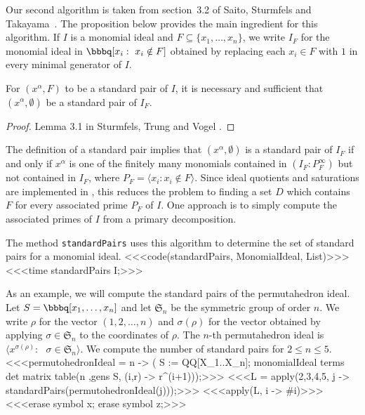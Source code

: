 Our second algorithm is taken from section~3.2 of Saito, Sturmfels and
Takayama~\cite{MR1734566}.  The proposition below provides the main
ingredient for this algorithm.  If $I$ is a monomial ideal and $F
\subseteq \{ x_{1},\dotsc, x_{n} \}$, we write $I_F$ for the monomial
ideal in $\bbbq[x_i : \text{ $x_{i} \notin F$}]$ obtained by replacing
each $x_{i} \in F$ with $1$ in every minimal generator of $I$.

\begin{proposition} 
For $(x^{\alpha}, F)$ to be a standard pair of $I$, it is necessary
and sufficient that $(x^{\alpha}, \emptyset)$ be a standard pair of
$I_F$.
\end{proposition}

\begin{proof} 
Lemma 3.1 in Sturmfels, Trung and Vogel \cite{MR96i:13029}.
\end{proof}

The definition of a standard pair implies that
$(x^{\alpha}, \emptyset)$ is a standard pair of $I_F$ if and only if
$x^{\alpha}$ is one of the finitely many monomials contained in $(I_F
: P_F^\infty)$ but not contained in $I_F$, where $P_F = \langle x_i:
x_i \notin F \rangle$.  Since ideal quotients and saturations are
implemented in \Mtwo, this reduces the problem to finding a set $D$
which contains $F$ for every associated prime $P_{F}$ of $I$.  One
approach is to simply compute the associated primes of $I$ from a
primary decomposition.

The method {\tt standardPairs} uses this algorithm to determine the
set of standard pairs for a monomial ideal.
<<<code(standardPairs, MonomialIdeal, List)>>>
<<<time standardPairs I;>>>

As an example, we will compute the standard pairs of the permutahedron
ideal. Let $S = \bbbq[x_1, \dotsc, x_n]$
and let $\mathfrak{S}_n$ be the symmetric group of order $n$.  We
write $\rho$ for the vector $(1, 2, \dotsc, n)$ and $\sigma(\rho)$ for
the vector obtained by applying $\sigma \in \mathfrak{S}_n$ to the
coordinates of $\rho$. The $n$-th permutahedron ideal is $\langle
x^{\sigma(\rho)} : \text{ $\sigma \in \mathfrak{S}_n$} \rangle$.  We
compute the number of standard pairs for $2 \leq n \leq 5$.
<<<permutohedronIdeal = n -> (
     S := QQ[X_1..X_n];
     monomialIdeal terms det matrix table(n ,gens S, 
          (i,r) -> r^(i+1)));>>>
<<<L = apply({2,3,4,5}, j -> standardPairs(permutohedronIdeal(j)));>>>
<<<apply(L, i -> #i)>>>
<<<erase symbol x; erase symbol z;>>>


